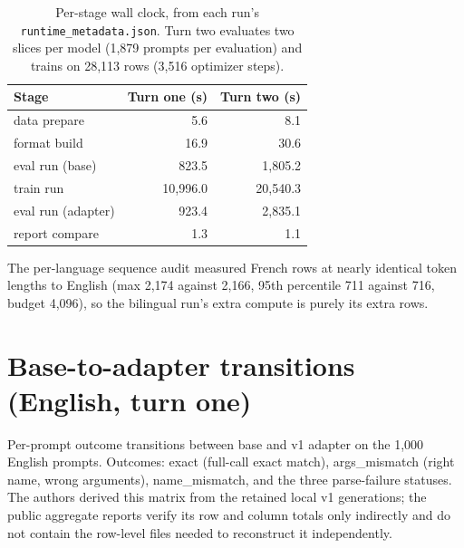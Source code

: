 \documentclass{article}
\begin{document}
\begin{table}[h]
  \caption{Per-stage wall clock, from each run's \texttt{runtime\_metadata.json}. Turn two evaluates two slices per model (1{,}879 prompts per evaluation) and trains on 28{,}113 rows (3{,}516 optimizer steps).}
  \label{tab:runtime}
  \centering
  \small
  \begin{tabular}{lrr}
    \toprule
    Stage & Turn one (s) & Turn two (s) \\
    \midrule
    data prepare & 5.6 & 8.1 \\
    format build & 16.9 & 30.6 \\
    eval run (base) & 823.5 & 1{,}805.2 \\
    train run & 10{,}996.0 & 20{,}540.3 \\
    eval run (adapter) & 923.4 & 2{,}835.1 \\
    report compare & 1.3 & 1.1 \\
    \bottomrule
  \end{tabular}
\end{table}

The per-language sequence audit measured French rows at nearly identical token lengths to English (max 2{,}174 against 2{,}166, 95th percentile 711 against 716, budget 4{,}096), so the bilingual run's extra compute is purely its extra rows.

\section{Base-to-adapter transitions (English, turn one)}
\label{app:transitions}

Per-prompt outcome transitions between base and v1 adapter on the 1{,}000 English prompts. Outcomes: exact (full-call exact match), args\_mismatch (right name, wrong arguments), name\_mismatch, and the three parse-failure statuses. The authors derived this matrix from the retained local v1 generations; the public aggregate reports verify its row and column totals only indirectly and do not contain the row-level files needed to reconstruct it independently.
\end{document}
